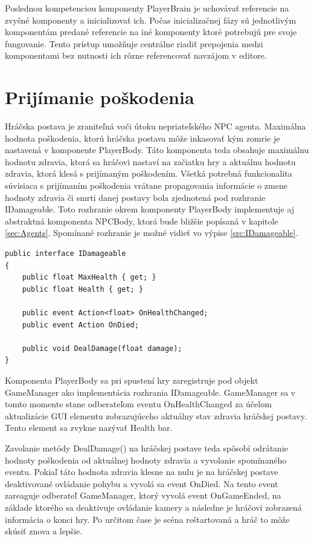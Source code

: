 \documentclass[slovak, master]{diploma}
\begin{document}
Poslednou kompetenciou komponenty PlayerBrain je uchovávať referencie na zvyšné komponenty a inicializovať ich. Počas inicializačnej fázy sú jednotlivým komponentám predané referencie na iné komponenty ktoré potrebujú pre svoje fungovanie. Tento prístup umožňuje centrálne riadiť prepojenia medzi komponentami bez nutnosti ich rôzne referencovať navzájom v editore.

\section{Prijímanie poškodenia}
\label{sec:DealingDamage}
Hráčska postava je zraniteľná voči útoku nepriateľského NPC agenta. Maximálna hodnota poškodenia, ktorú hráčska postava môže inkasovať kým zomrie je nastavená v komponente PlayerBody. Táto komponenta teda obsahuje maximálnu hodnotu zdravia, ktorá sa hráčovi nastaví na začiatku hry a aktuálnu hodnotu zdravia, ktorá klesá s prijímaným poškodením. Všetká potrebná funkcionalita súvisiaca s prijímaním poškodenia vrátane propagovania informácie o zmene hodnoty zdravia či smrti danej postavy bola zjednotená pod rozhranie IDamageable. Toto rozhranie okrem komponenty PlayerBody implementuje aj abstraktná komponenta NPCBody, ktorá bude bližšie popísaná v kapitole \ref{sec:Agents}. Spomínané rozhranie je možné vidieť vo výpise \ref{src:IDamageable}. 

\vspace{8pt}
\begin{lstlisting}[label=src:IDamageable,caption={Rohranie IDamageable}]
public interface IDamageable
{
    public float MaxHealth { get; }
    public float Health { get; }

    public event Action<float> OnHealthChanged;
    public event Action OnDied;

    public void DealDamage(float damage);
}
\end{lstlisting}

Komponenta PlayerBody sa pri spustení hry zaregistruje pod objekt GameManager ako implementácia rozhrania IDamageable. GameManager sa v tomto momente stane odberateľom eventu OnHealthChanged za účelom aktualizácie GUI elementu zobrazujúceho aktuálny stav zdravia hráčskej postavy. Tento element sa zvykne nazývať Health bar.

Zavolanie metódy DealDamage() na hráčskej postave teda spôsobí odrátanie hodnoty poškodenia od aktuálnej hodnoty zdravia a vyvolanie spomínaného eventu. Pokiaľ táto hodnota zdravia klesne na nulu je na hráčskej postave deaktivované ovládanie pohybu a vyvolá sa event OnDied. Na tento event zareaguje odberateľ GameManager, ktorý vyvolá event OnGameEnded, na základe ktorého sa deaktivuje ovládanie kamery a následne je hráčovi zobrazená informácia o konci hry. Po určitom čase je scéna reštartovaná a hráč to môže skúsiť znova a lepšie. 
\end{document}
